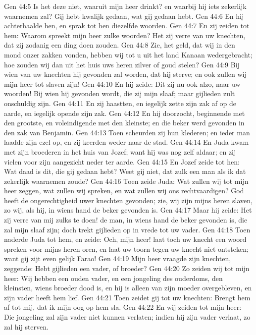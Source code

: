 Gen 44:5  Is het deze niet, waaruit mijn heer drinkt? en waarbij hij iets zekerlijk waarnemen zal? Gij hebt kwalijk gedaan, wat gij gedaan hebt.
Gen 44:6  En hij achterhaalde hen, en sprak tot hen diezelfde woorden.
Gen 44:7  En zij zeiden tot hem: Waarom spreekt mijn heer zulke woorden? Het zij verre van uw knechten, dat zij zodanig een ding doen zouden.
Gen 44:8  Zie, het geld, dat wij in den mond onzer zakken vonden, hebben wij tot u uit het land Kanaan wedergebracht; hoe zouden wij dan uit het huis uws heren zilver of goud stelen?
Gen 44:9  Bij wien van uw knechten hij gevonden zal worden, dat hij sterve; en ook zullen wij mijn heer tot slaven zijn!
Gen 44:10  En hij zeide: Dit zij nu ook alzo, naar uw woorden! Bij wien hij gevonden wordt, die zij mijn slaaf; maar gijlieden zult onschuldig zijn.
Gen 44:11  En zij haastten, en iegelijk zette zijn zak af op de aarde, en iegelijk opende zijn zak.
Gen 44:12  En hij doorzocht, beginnende met den grootste, en voleindigende met den kleinste; en die beker werd gevonden in den zak van Benjamin.
Gen 44:13  Toen scheurden zij hun klederen; en ieder man laadde zijn ezel op, en zij keerden weder naar de stad.
Gen 44:14  En Juda kwam met zijn broederen in het huis van Jozef; want hij was nog zelf aldaar; en zij vielen voor zijn aangezicht neder ter aarde.
Gen 44:15  En Jozef zeide tot hen: Wat daad is dit, die gij gedaan hebt? Weet gij niet, dat zulk een man als ik dat zekerlijk waarnemen zoude?
Gen 44:16  Toen zeide Juda: Wat zullen wij tot mijn heer zeggen, wat zullen wij spreken, en wat zullen wij ons rechtvaardigen? God heeft de ongerechtigheid uwer knechten gevonden; zie, wij zijn mijns heren slaven, zo wij, als hij, in wiens hand de beker gevonden is.
Gen 44:17  Maar hij zeide: Het zij verre van mij zulks te doen! de man, in wiens hand de beker gevonden is, die zal mijn slaaf zijn; doch trekt gijlieden op in vrede tot uw vader.
Gen 44:18  Toen naderde Juda tot hem, en zeide: Och, mijn heer! laat toch uw knecht een woord spreken voor mijns heren oren, en laat uw toorn tegen uw knecht niet ontsteken; want gij zijt even gelijk Farao!
Gen 44:19  Mijn heer vraagde zijn knechten, zeggende: Hebt gijlieden een vader, of broeder?
Gen 44:20  Zo zeiden wij tot mijn heer: Wij hebben een ouden vader, en een jongeling des ouderdoms, den kleinsten, wiens broeder dood is, en hij is alleen van zijn moeder overgebleven, en zijn vader heeft hem lief.
Gen 44:21  Toen zeidet gij tot uw knechten: Brengt hem af tot mij, dat ik mijn oog op hem sla.
Gen 44:22  En wij zeiden tot mijn heer: Die jongeling zal zijn vader niet kunnen verlaten; indien hij zijn vader verlaat, zo zal hij sterven.
